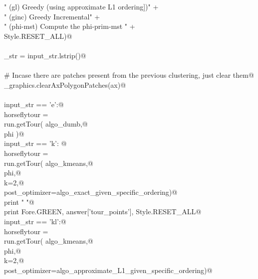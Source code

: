 \documentclass[11.5pt]{report}
\begin{document}
\begin{flushleft}
\begin{list}{}{}
\mbox{}\verb@        "  (gl)   Greedy (using approximate L1 ordering])\n"                 +\@\\
\mbox{}\verb@        "  (ginc) Greedy Incremental\n"                                      +\@\\
\mbox{}\verb@        "  (phi-mst) Compute the phi-prim-mst "                              +\@\\
\mbox{}\verb@        Style.RESET_ALL)@\\
\mbox{}\verb@@\\
\mbox{}\verb@input_str = input_str.lstrip()@\\
\mbox{}\verb@@\\
\mbox{}\verb@# Incase there are patches present from the previous clustering, just clear them@\\
\mbox{}\verb@utils_graphics.clearAxPolygonPatches(ax)@\\
\mbox{}\verb@@\\
\mbox{}\verb@if   input_str == 'e':@\\
\mbox{}\verb@      horseflytour = \@\\
\mbox{}\verb@             run.getTour( algo_dumb,@\\
\mbox{}\verb@                          phi )@\\
\mbox{}\verb@elif input_str == 'k': @\\
\mbox{}\verb@      horseflytour = \@\\
\mbox{}\verb@             run.getTour( algo_kmeans,@\\
\mbox{}\verb@                          phi,@\\
\mbox{}\verb@                          k=2,@\\
\mbox{}\verb@                          post_optimizer=algo_exact_given_specific_ordering)@\\
\mbox{}\verb@      print " "@\\
\mbox{}\verb@      print Fore.GREEN, answer['tour_points'], Style.RESET_ALL@\\
\mbox{}\verb@elif input_str == 'kl':@\\
\mbox{}\verb@      horseflytour = \@\\
\mbox{}\verb@             run.getTour( algo_kmeans,@\\
\mbox{}\verb@                          phi,@\\
\mbox{}\verb@                          k=2,@\\
\mbox{}\verb@                          post_optimizer=algo_approximate_L1_given_specific_ordering)@\\

\end{list}
\end{flushleft}
\end{document}
